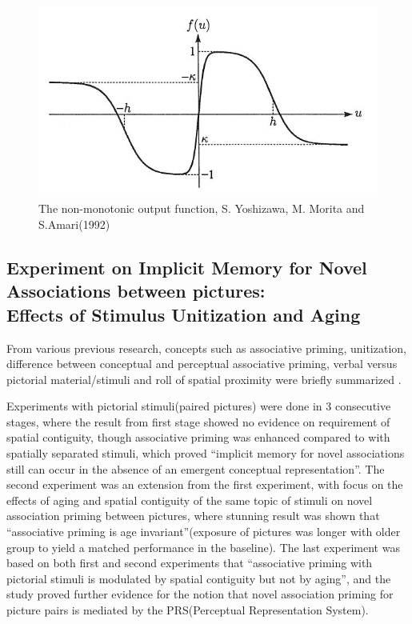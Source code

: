 \begin{figure}[htbp]
	\centering
	\includegraphics[scale = 0.8]{inc/nonmonotonic.jpg}
	\caption{The non-monotonic output function, S. Yoshizawa, M. Morita and S.Amari(1992)}
	\label{fig:nonmonotonic}
\end{figure}

\subsection{Experiment on Implicit Memory for Novel Associations between pictures: \\ Effects of Stimulus Unitization and Aging}

From various previous research, concepts such as associative priming, unitization, difference between conceptual and perceptual associative priming, verbal versus pictorial material/stimuli and roll of spatial proximity were briefly summarized \cite{stimulus_unitization_and_aging}.

Experiments with pictorial stimuli(paired pictures) were done in 3 consecutive stages, where the result from first stage showed no evidence on requirement of spatial contiguity, though associative priming was enhanced compared to with spatially separated stimuli, which proved ``implicit memory for novel associations still can occur in the absence of an emergent conceptual representation''. The second experiment was an extension from the first experiment, with focus on the effects of aging and spatial contiguity of the same topic of stimuli on novel association priming between pictures, where stunning result was shown that ``associative priming is age invariant''(exposure of pictures was longer with older group to yield a matched performance in the baseline). The last experiment was based on both first and second experiments that ``associative priming with pictorial stimuli is modulated by spatial contiguity but not by aging'', and the study proved further evidence for the notion that novel association priming for picture pairs is mediated by the PRS(Perceptual Representation System).


%
%
%
%
